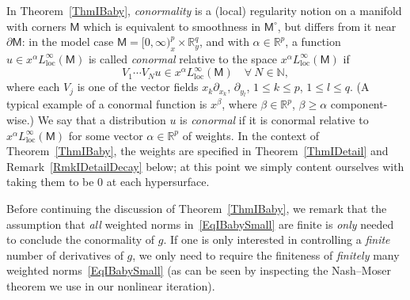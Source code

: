 \documentclass[reqno,11pt,letterpaper]{amsart}
\numberwithin{equation}{section}
\numberwithin{figure}{section}
\theoremstyle{definition}
\theoremstyle{remark}
\newcommand{\N}{\mathbb{N}}
\newcommand{\R}{\mathbb{R}}
\newcommand{\sfM}{\mathsf{M}}
\newcommand{\pa}{\partial}
\newcommand{\loc}{{\mathrm{loc}}}
\begin{document}
In Theorem~\ref{ThmIBaby}, \emph{conormality} is a (local) regularity notion on a manifold with corners $\sfM$ which is equivalent to smoothness in $\sfM^\circ$, but differs from it near $\pa\sfM$: in the model case $\sfM=[0,\infty)_x^p\times\R_y^q$, and with $\alpha\in\R^p$, a function $u\in x^\alpha L^\infty_\loc(\sfM)$ is called \emph{conormal} relative to the space $x^\alpha L^\infty_\loc(\sfM)$ if
\[
  V_1\cdots V_N u \in x^\alpha L^\infty_\loc(\sfM)\quad \forall\ N\in\N,
\]
where each $V_j$ is one of the vector fields $x_k\pa_{x_k}$, $\pa_{y_l}$, $1\leq k\leq p$, $1\leq l\leq q$. (A typical example of a conormal function is $x^\beta$, where $\beta\in\R^p$, $\beta\geq\alpha$ component-wise.) We say that a distribution $u$ is \emph{conormal} if it is conormal relative to $x^\alpha L^\infty_\loc(\sfM)$ for some vector $\alpha\in\R^p$ of weights. In the context of Theorem~\ref{ThmIBaby}, the weights are specified in Theorem~\ref{ThmIDetail} and Remark~\ref{RmkIDetailDecay} below; at this point we simply content ourselves with taking them to be $0$ at each hypersurface.

Before continuing the discussion of Theorem~\ref{ThmIBaby}, we remark that the assumption that \emph{all} weighted norms in~\eqref{EqIBabySmall} are finite is \emph{only} needed to conclude the conormality of $g$. If one is only interested in controlling a \emph{finite} number of derivatives of $g$, we only need to require the finiteness of \emph{finitely} many weighted norms~\eqref{EqIBabySmall} (as can be seen by inspecting the Nash--Moser theorem we use in our nonlinear iteration).
\end{document}
